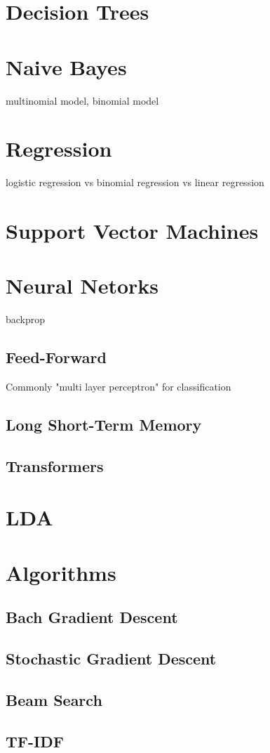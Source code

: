 \documentclass[11pt]{article}
\begin{document}
\section{Decision Trees}

\section{Naive Bayes}
multinomial model, binomial model

\section{Regression}
logistic regression vs binomial regression vs linear regression

\section{Support Vector Machines}

\section{Neural Netorks}
backprop
\subsection{Feed-Forward}
Commonly "multi layer perceptron" for classification

\subsection{Long Short-Term Memory}

\subsection{Transformers}

\section{LDA}

\section{Algorithms}
\subsection{Bach Gradient Descent}
\subsection{Stochastic Gradient Descent}

\subsection{Beam Search}

\subsection{TF-IDF}
\end{document}
